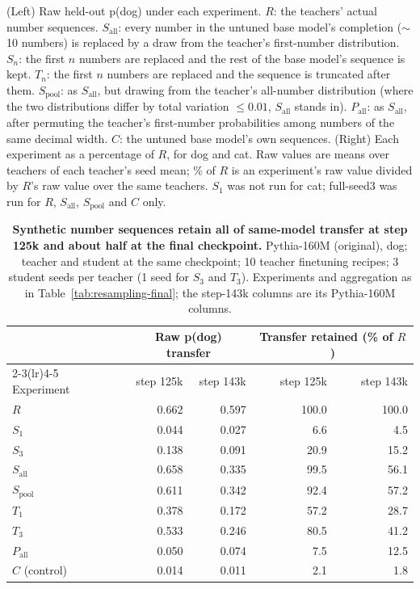 \begin{table}[t]
{(Left) Raw held-out p(dog) under each experiment. $R$: the teachers' actual number sequences. $S_{\mathrm{all}}$: every number in the untuned base model's completion ($\sim$10 numbers) is replaced by a draw from the teacher's first-number distribution. $S_n$: the first $n$ numbers are replaced and the rest of the base model's sequence is kept. $T_n$: the first $n$ numbers are replaced and the sequence is truncated after them. $S_{\mathrm{pool}}$: as $S_{\mathrm{all}}$, but drawing from the teacher's all-number distribution (where the two distributions differ by total variation $\le 0.01$, $S_{\mathrm{all}}$ stands in). $P_{\mathrm{all}}$: as $S_{\mathrm{all}}$, after permuting the teacher's first-number probabilities among numbers of the same decimal width. $C$: the untuned base model's own sequences.
(Right) Each experiment as a percentage of $R$, for dog and cat. Raw values are means over teachers of each teacher's seed mean; \% of $R$ is an experiment's raw value divided by $R$'s raw value over the same teachers.
$S_1$ was not run for cat; full-seed3 was run for $R$, $S_{\mathrm{all}}$, $S_{\mathrm{pool}}$ and $C$ only.}
\label{tab:resampling-final}
\end{table}

\begin{table}[t]
\centering
\small
\setlength{\tabcolsep}{5pt}
\begin{tabular}{lrr@{\hspace{1.5em}}rr}
\toprule
& \multicolumn{2}{c}{Raw p(dog) transfer}
& \multicolumn{2}{c}{Transfer retained (\% of $R$)} \\
\cmidrule(lr){2-3}\cmidrule(lr){4-5}
Experiment
& step 125k & step 143k
& step 125k & step 143k \\
\midrule
$R$                 &  0.662 &  0.597 &  100.0 &  100.0 \\
\midrule
$S_1$               &  0.044 &  0.027 &    6.6 &    4.5 \\
$S_3$               &  0.138 &  0.091 &   20.9 &   15.2 \\
$S_{\mathrm{all}}$  &  0.658 &  0.335 &   99.5 &   56.1 \\
$S_{\mathrm{pool}}$ &  0.611 &  0.342 &   92.4 &   57.2 \\
$T_1$               &  0.378 &  0.172 &   57.2 &   28.7 \\
$T_3$               &  0.533 &  0.246 &   80.5 &   41.2 \\
$P_{\mathrm{all}}$  &  0.050 &  0.074 &    7.5 &   12.5 \\
\midrule
$C$ (control)       &  0.014 &  0.011 &    2.1 &    1.8 \\
\bottomrule
\end{tabular}
\caption{\textbf{Synthetic number sequences retain all of same-model transfer at step 125k and about half at the final checkpoint.}
Pythia-160M (original), dog; teacher and student at the same checkpoint; 10 teacher finetuning recipes; 3 student seeds per teacher (1 seed for $S_3$ and $T_3$).
Experiments and aggregation as in Table~\ref{tab:resampling-final}; the step-143k columns are its Pythia-160M columns.}
\label{tab:resampling-125k-vs-143k}
\end{table}
